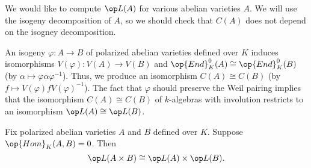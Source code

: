 \documentclass{article}
\begin{document}
We would like to compute $\op L(A)$ for various abelian varieties $A$. We will use the isogeny decomposition of $A$, so we should check that $C(A)$ does not depend on the isogney decomposition.
\begin{remark}
	An isogeny $\varphi\colon A\to B$ of polarized abelian varieties defined over $K$ induces isomorphisms $V(\varphi)\colon V(A)\to V(B)$ and $\op{End}_K^0(A)\cong\op{End}_K^0(B)$ (by $\alpha\mapsto\varphi\alpha\varphi^{-1}$). Thus, we produce an isomorphism $C(A)\cong C(B)$ (by $f\mapsto V(\varphi) fV(\varphi)^{-1}$). The fact that $\varphi$ should preserve the Weil pairing implies that the isomorphism $C(A)\cong C(B)$ of $k$-algebras with involution restricts to an isomorphism $\op L(A)\cong\op L(B)$.
\end{remark}
\begin{lemma} \label{lem:prod-av-lefschetz}
	Fix polarized abelian varieties $A$ and $B$ defined over $K$. Suppose $\op{Hom}_K(A,B)=0$. Then
	\[\op L(A\times B)\cong\op L(A)\times\op L(B).\]
\end{lemma}
\end{document}
